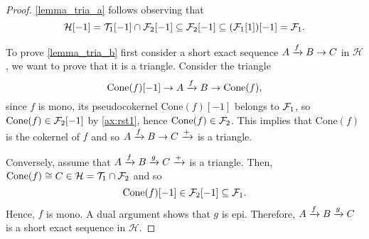 \begin{proof}
  \ref{lemma_tria_a} follows observing that
  \[\mathcal{H}[-1]=\mathcal{T}_1[-1]\cap\mathcal{F}_2[-1]\subseteq \mathcal{F}_2[-1]\subseteq(\mathcal{F}_1[1])[-1]=\mathcal{F}_1.\]

  To prove \ref{lemma_tria_b} first consider a short exact sequence $A\xrightarrow{f} B\to C$ in $\mathcal{H}$, we want to
  prove that it is a triangle. Consider the triangle
  \begin{equation*}
    \mathrm{Cone}(f)[-1]\to A\xrightarrow{f} B \to \mathrm{Cone}(f),
  \end{equation*}
  since $f$ is mono, its pseudocokernel $\mathrm{Cone}(f)[-1]$ belongs to $\mathcal{F}_1$, so
  $\mathrm{Cone}(f)\in\mathcal{F}_2[-1]$ by \ref{ax:rst1}, hence $\mathrm{Cone}(f)\in\mathcal{F}_2$.
  This implies that $\mathrm{Cone}(f)$ is the cokernel of $f$ and so $A\xrightarrow{f} B\to C\xrightarrow{+}$ is a triangle.

  Conversely, assume that $A\xrightarrow{f} B\xrightarrow{g} C\xrightarrow{+}$ is a triangle. Then, $\mathrm{Cone}(f)\cong C\in\mathcal{H}=\mathcal{T}_1\cap\mathcal{F}_2$ and
  so \[\mathrm{Cone}(f)[-1]\in\mathcal{F}_2[-1]\subseteq \mathcal{F}_1.\] Hence, $f$ is mono. A dual argument
  shows that $g$ is epi. Therefore, $A\xrightarrow{f} B\xrightarrow{g} C$ is a short exact sequence in $\mathcal{H}$.
\end{proof}

